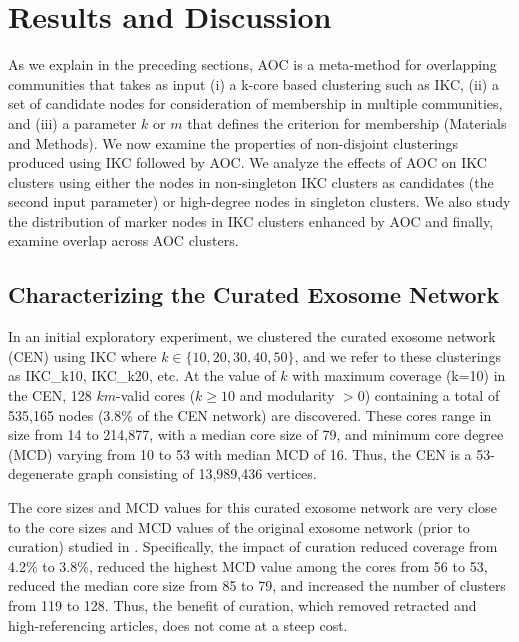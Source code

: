 \documentclass[12pt, oneside]{article}   	%
\begin{document}
\section{Results and Discussion}
	
As we explain in the preceding sections, AOC is a meta-method for overlapping communities that takes as input (i) a k-core based clustering such as IKC, (ii) a set of candidate nodes for consideration of membership in multiple communities, and (iii) a parameter $k$ or $m$ that defines the criterion for membership (Materials and Methods). We now examine the properties of non-disjoint clusterings produced using IKC followed by AOC. We analyze the effects of AOC on IKC clusters using either the nodes in non-singleton IKC clusters as candidates (the second input parameter) or high-degree nodes in singleton clusters. We also study the distribution of marker nodes in IKC clusters enhanced by AOC and finally, examine overlap across AOC clusters. 
	
\subsection{Characterizing the Curated Exosome Network}
 In an initial exploratory experiment, we clustered the curated exosome network (CEN) using IKC where $k \in {\{10,20,30,40, 50\}}$, and we refer to these clusterings as
 IKC\_{k10},  IKC\_{k20}, etc. 
At the value of $k$ with maximum coverage (k=10) in the CEN, 128 $km$-valid cores ($k \geq 10$ and modularity $> 0$) containing a total of 535,165 nodes (3.8\% of the CEN network) are discovered. These cores range in size from 14 to 214,877, with a median core size of 79, and minimum core degree (MCD) varying from 10 to 53 with median MCD of 16. Thus, the CEN is a 53-degenerate graph consisting of 13,989,436 vertices. 


The core sizes and MCD values for this curated exosome network are very close to the core sizes and MCD values of the original exosome network (prior to curation) studied in \cite{Wedell2022}.
Specifically, the impact of curation reduced coverage
 from 4.2\% to 3.8\%, reduced the highest MCD value among the cores from 56 to 53, reduced the median core size from 85 to 79, and increased the number of clusters  from 119 to 128.
 Thus, the benefit of curation, which removed retracted and high-referencing articles, does not come at a steep cost.
\end{document}
